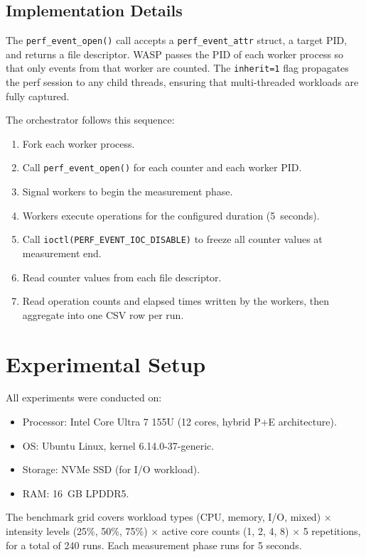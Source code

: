 \documentclass[conference]{IEEEtran}
\begin{document}
\subsection{Implementation Details}

The \texttt{perf\_event\_open()} call accepts a \texttt{perf\_event\_attr}
struct, a target PID, and returns a file descriptor.  WASP passes the PID of
each worker process so that only events from that worker are counted.  The
\texttt{inherit=1} flag propagates the perf session to any child threads,
ensuring that multi-threaded workloads are fully captured.

The orchestrator follows this sequence:
\begin{enumerate}
  \item Fork each worker process.
  \item Call \texttt{perf\_event\_open()} for each counter and each worker PID.
  \item Signal workers to begin the measurement phase.
  \item Workers execute operations for the configured duration (5~seconds).
  \item Call \texttt{ioctl(PERF\_EVENT\_IOC\_DISABLE)} to freeze all counter
        values at measurement end.
  \item Read counter values from each file descriptor.
  \item Read operation counts and elapsed times written by the workers, then
        aggregate into one CSV row per run.
\end{enumerate}

\section{Experimental Setup}
\label{sec:setup}

All experiments were conducted on:
\begin{itemize}
  \item Processor: Intel Core Ultra 7 155U (12 cores, hybrid P+E architecture).
  \item OS: Ubuntu Linux, kernel 6.14.0-37-generic.
  \item Storage: NVMe SSD (for I/O workload).
  \item RAM: 16~GB LPDDR5.
\end{itemize}

The benchmark grid covers workload types (CPU, memory, I/O, mixed) $\times$
intensity levels (25\%, 50\%, 75\%) $\times$ active core counts (1, 2, 4, 8)
$\times$ 5 repetitions, for a total of 240 runs.  Each measurement phase runs
for 5 seconds.
\end{document}
